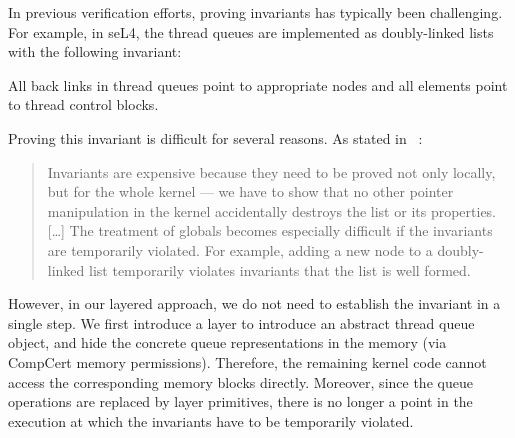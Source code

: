 In previous verification efforts,
proving invariants has typically been challenging.
For example, in seL4, the thread queues are implemented as doubly-linked lists with 
the following invariant:
\begin{invariant}
\label{inv:spec:queue}
 All back links in thread queues point to appropriate nodes and all elements point
 to thread control blocks.
\end{invariant}
Proving this invariant is difficult
for several reasons.
As stated in ~\cite{klein2009sel4}:
\begin{quote}
  Invariants are expensive because
  they need to be proved not only locally,
  but for the whole kernel ---
  we have to show that no other pointer manipulation in the kernel
  accidentally destroys the list or its properties.
  [\ldots]
  The treatment of globals becomes especially difficult
  if the invariants are temporarily violated.
  For example,
  adding a new node to a doubly-linked list
  temporarily violates invariants that the list is well formed.
\end{quote}
However, in our layered approach,
we do not need to establish the invariant in a single step.
We first introduce a layer to introduce
an abstract thread queue object,
and hide the concrete queue representations
in the memory (via CompCert memory permissions).
Therefore, the remaining kernel code cannot access
the corresponding memory blocks directly.
Moreover, since the queue operations 
are replaced by  layer primitives,
there is no longer a point in the execution
at which the invariants have to be temporarily violated.
